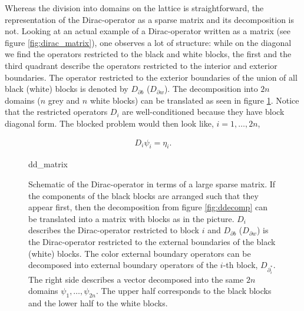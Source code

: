 \documentclass{article}
\theoremstyle{plain} %
\theoremstyle{convention} %
\theoremstyle{remark} %
\numberwithin{equation}{section}
\begin{document}
Whereas the division into domains on the lattice is straightforward, the representation of the Dirac-operator as a sparse matrix and its decomposition is not. Looking at an actual example of a Dirac-operator written as a matrix (see figure \ref{fig:dirac_matrix}), one observes a lot of structure: while on the diagonal we find the operators restricted to the black and white blocks, the first and the third quadrant describe the operators restricted to the interior and exterior boundaries. The operator restricted to the exterior boundaries of the union of all black (white) blocks is denoted by $D_{\partial b}$ ($D_{\partial w}$). The decomposition into $2n$ domains ($n$ grey and $n$ white blocks) can be translated as seen in figure \ref{fig:ddecomp_matrix}. Notice that the restricted operators $D_i$ are well-conditioned because they have block diagonal form. The blocked problem would then look like, $i = 1, \dots, 2n$,

\begin{align*}
    D_i \psi_i = \eta_i.
\end{align*}

\begin{figure}[h]
  \centering
  {dd_matrix}
  \caption{Schematic of the Dirac-operator in terms of a large sparse matrix. If the components of the black blocks are arranged such that they appear first, then the decomposition from figure \ref{fig:ddecomp} can be translated into a matrix with blocks as in the picture. $D_i$ describes the Dirac-operator restricted to block $i$ and $D_{\partial b}$ ($D_{\partial w}$) is the Dirac-operator restricted to the external boundaries of the black (white) blocks. The color external boundary operators can be decomposed into external boundary operators of the $i$-th block, $D_{\partial^{*}_i}$. The right side describes a vector decomposed into the same $2n$ domains $\psi_1, \dots, \psi_{2n}$. The upper half corresponds to the black blocks and the lower half to the white blocks.}
  \label{fig:ddecomp_matrix}
\end{figure}

\end{document}
